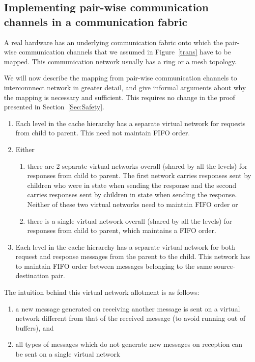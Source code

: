\subsection{Implementing pair-wise communication channels in a communication
fabric}

A real hardware has an underlying communication fabric onto which the pair-wise
communication channels that we assumed in Figure~\ref{trans} have to be mapped.
This communication network usually has a ring or a mesh topology.

We will now describe the mapping from pair-wise communication channels
to interconnnect network in greater detail, and give informal arguments
about why the mapping is necessary and sufficient. This requires no change in
the proof presented in Section~\ref{Sec:Safety}.

\begin{enumerate}
\item Each level in the cache hierarchy has a separate virtual network
  for requests from child to parent. This need not maintain FIFO order.

\item Either
  \begin{enumerate}
    \item there are 2 separate virtual networks overall (shared by all the levels)
      for responses from child to parent. The first network carries responses sent by
      children who were in state \Mo{} when sending the response and the second
      carries responses sent by children in state \Sh{} when sending the response.
      Neither of these two virtual networks need to maintain FIFO order or
    \item there is a single virtual network overall (shared by all the levels) for
      responses from child to parent, which maintains a FIFO order.
  \end{enumerate}

\item Each level in the cache hierarchy has a separate virtual network
  for both request and response messages from the parent to the child. This
  network has to maintain FIFO order between messages belonging to the same
  source-destination pair.
\end{enumerate}

The intuition behind this virtual network allotment is as follows:
\begin{enumerate}
\item a new message generated on receiving another message is sent on a virtual
  network different from that of the received message (to avoid running out of
  buffers), and
\item all types of messages which do not generate new messages on reception can
  be sent on a single virtual network
\end{enumerate}

